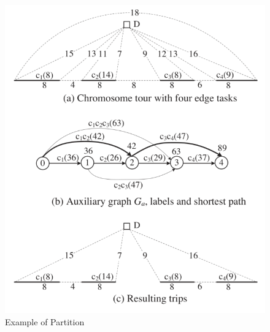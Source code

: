 \documentclass[journal,twoside,web]{ieeecolor}
\begin{document}
\begin{figure}[!t]
\centerline{\includegraphics[width=\columnwidth]{chromesome.png}}
\caption{Example of Partition}
\label{chromesome}
\end{figure}
\end{document}
